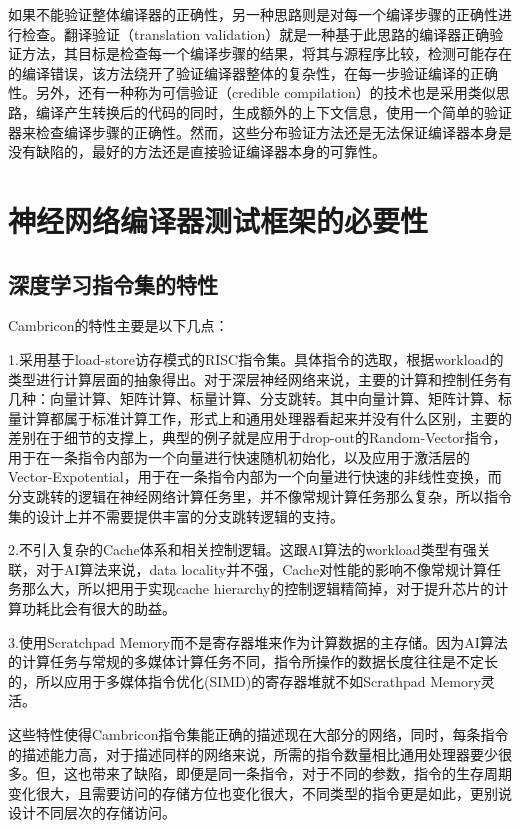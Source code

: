 如果不能验证整体编译器的正确性，另一种思路则是对每一个编译步骤的正确性进行检查。翻译验证（translation validation）就是一种基于此思路的编译器正确验证方法，其目标是检查每一个编译步骤的结果，将其与源程序比较，检测可能存在的编译错误，该方法绕开了验证编译器整体的复杂性，在每一步验证编译的正确性。另外，还有一种称为可信验证（credible compilation）的技术也是采用类似思路，编译产生转换后的代码的同时，生成额外的上下文信息，使用一个简单的验证器来检查编译步骤的正确性。然而，这些分布验证方法还是无法保证编译器本身是没有缺陷的，最好的方法还是直接验证编译器本身的可靠性。

\section{神经网络编译器测试框架的必要性}

\subsection{深度学习指令集的特性}
Cambricon的特性主要是以下几点：

1.采用基于load-store访存模式的RISC指令集。具体指令的选取，根据workload的类型进行计算层面的抽象得出。对于深层神经网络来说，主要的计算和控制任务有几种：向量计算、矩阵计算、标量计算、分支跳转。其中向量计算、矩阵计算、标量计算都属于标准计算工作，形式上和通用处理器看起来并没有什么区别，主要的差别在于细节的支撑上，典型的例子就是应用于drop-out的Random-Vector指令，用于在一条指令内部为一个向量进行快速随机初始化，以及应用于激活层的Vector-Expotential，用于在一条指令内部为一个向量进行快速的非线性变换，而分支跳转的逻辑在神经网络计算任务里，并不像常规计算任务那么复杂，所以指令集的设计上并不需要提供丰富的分支跳转逻辑的支持。

2.不引入复杂的Cache体系和相关控制逻辑。这跟AI算法的workload类型有强关联，对于AI算法来说，data locality并不强，Cache对性能的影响不像常规计算任务那么大，所以把用于实现cache hierarchy的控制逻辑精简掉，对于提升芯片的计算功耗比会有很大的助益。

3.使用Scratchpad Memory而不是寄存器堆来作为计算数据的主存储。因为AI算法的计算任务与常规的多媒体计算任务不同，指令所操作的数据长度往往是不定长的，所以应用于多媒体指令优化(SIMD)的寄存器堆就不如Scrathpad Memory灵活。

这些特性使得Cambricon指令集能正确的描述现在大部分的网络，同时，每条指令的描述能力高，对于描述同样的网络来说，所需的指令数量相比通用处理器要少很多。但，这也带来了缺陷，即便是同一条指令，对于不同的参数，指令的生存周期变化很大，且需要访问的存储方位也变化很大，不同类型的指令更是如此，更别说设计不同层次的存储访问。

